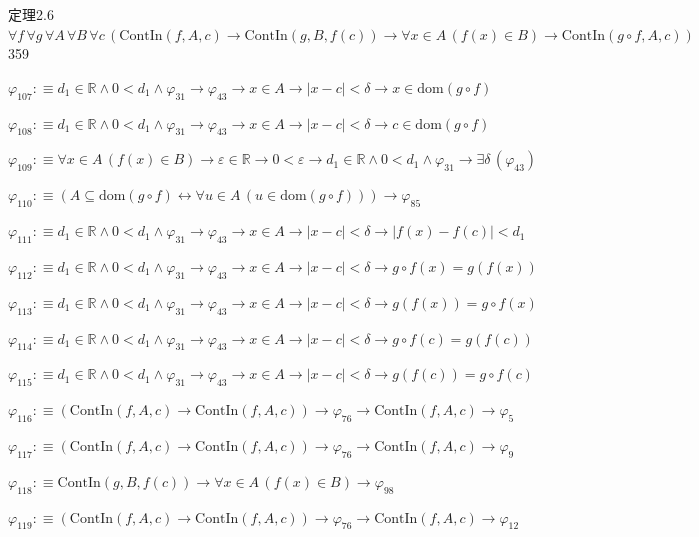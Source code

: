 \begin{fullproof}{定理2.6}{$\forall f\,\forall g\,\forall A\,\forall B\,\forall c\,(\mathrm{ContIn}(f,A,c) \to \mathrm{ContIn}(g,B,f(c)) \to \forall x \in A\,(f(x) \in B) \to \mathrm{ContIn}(g \circ f,A,c))$}{359}
\begin{abbrevlist}
\item $\varphi_{107} :\equiv d_{1} \in \mathbb{R} \land 0 < d_{1} \land \varphi_{31} \to \varphi_{43} \to x \in A \to \lvert x - c \rvert < \delta \to x \in \mathrm{dom}(g \circ f)$
\item $\varphi_{108} :\equiv d_{1} \in \mathbb{R} \land 0 < d_{1} \land \varphi_{31} \to \varphi_{43} \to x \in A \to \lvert x - c \rvert < \delta \to c \in \mathrm{dom}(g \circ f)$
\item $\varphi_{109} :\equiv \forall x \in A\,(f(x) \in B) \to \varepsilon \in \mathbb{R} \to 0 < \varepsilon \to d_{1} \in \mathbb{R} \land 0 < d_{1} \land \varphi_{31} \to \exists \delta\,(\varphi_{43})$
\item $\varphi_{110} :\equiv (A \subseteq \mathrm{dom}(g \circ f) \leftrightarrow \forall u \in A\,(u \in \mathrm{dom}(g \circ f))) \to \varphi_{85}$
\item $\varphi_{111} :\equiv d_{1} \in \mathbb{R} \land 0 < d_{1} \land \varphi_{31} \to \varphi_{43} \to x \in A \to \lvert x - c \rvert < \delta \to \lvert f(x) - f(c) \rvert < d_{1}$
\item $\varphi_{112} :\equiv d_{1} \in \mathbb{R} \land 0 < d_{1} \land \varphi_{31} \to \varphi_{43} \to x \in A \to \lvert x - c \rvert < \delta \to g \circ f(x) = g(f(x))$
\item $\varphi_{113} :\equiv d_{1} \in \mathbb{R} \land 0 < d_{1} \land \varphi_{31} \to \varphi_{43} \to x \in A \to \lvert x - c \rvert < \delta \to g(f(x)) = g \circ f(x)$
\item $\varphi_{114} :\equiv d_{1} \in \mathbb{R} \land 0 < d_{1} \land \varphi_{31} \to \varphi_{43} \to x \in A \to \lvert x - c \rvert < \delta \to g \circ f(c) = g(f(c))$
\item $\varphi_{115} :\equiv d_{1} \in \mathbb{R} \land 0 < d_{1} \land \varphi_{31} \to \varphi_{43} \to x \in A \to \lvert x - c \rvert < \delta \to g(f(c)) = g \circ f(c)$
\item $\varphi_{116} :\equiv (\mathrm{ContIn}(f,A,c) \to \mathrm{ContIn}(f,A,c)) \to \varphi_{76} \to \mathrm{ContIn}(f,A,c) \to \varphi_{5}$
\item $\varphi_{117} :\equiv (\mathrm{ContIn}(f,A,c) \to \mathrm{ContIn}(f,A,c)) \to \varphi_{76} \to \mathrm{ContIn}(f,A,c) \to \varphi_{9}$
\item $\varphi_{118} :\equiv \mathrm{ContIn}(g,B,f(c)) \to \forall x \in A\,(f(x) \in B) \to \varphi_{98}$
\item $\varphi_{119} :\equiv (\mathrm{ContIn}(f,A,c) \to \mathrm{ContIn}(f,A,c)) \to \varphi_{76} \to \mathrm{ContIn}(f,A,c) \to \varphi_{12}$

\end{abbrevlist}
\end{fullproof}
